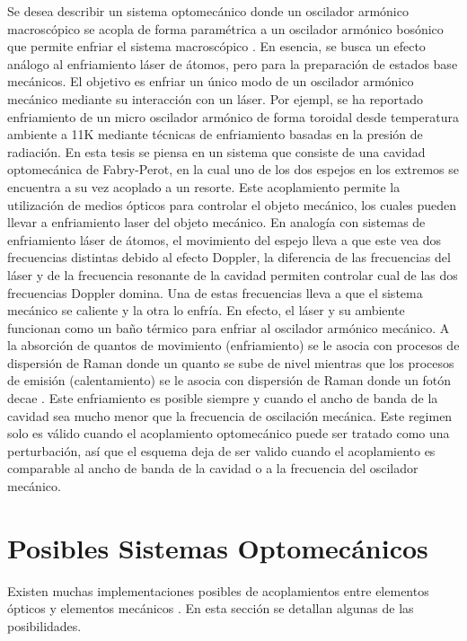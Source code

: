 \documentclass[a4paper,10pt]{report}
\begin{document}
Se desea describir un sistema optomecánico donde un oscilador armónico macroscópico se acopla de forma paramétrica a un oscilador armónico bosónico que permite enfriar el sistema macroscópico \cite{NooshiLC}. En esencia, se busca un efecto análogo al enfriamiento láser de átomos, pero para la preparación de estados base mecánicos. El objetivo es enfriar un único modo de un oscilador armónico mecánico mediante su interacción con un láser. Por ejempl, se ha reportado enfriamiento de un micro oscilador armónico de forma toroidal desde temperatura ambiente a 11K mediante técnicas de enfriamiento basadas en la presión de radiación\cite{SchliesserRPC}. En esta tesis se piensa en un sistema que consiste de una cavidad optomecánica de Fabry-Perot, en la cual uno de los dos espejos en los extremos se encuentra a su vez acoplado a un resorte. Este acoplamiento permite la utilización de medios ópticos para controlar el objeto mecánico, los cuales pueden llevar a enfriamiento laser del objeto mecánico\cite{NooshiLC}. En analogía con sistemas de enfriamiento láser de átomos, el movimiento del espejo lleva a que este vea dos frecuencias distintas debido al efecto Doppler\cite{KippenberCO}, la diferencia de las frecuencias del láser y de la frecuencia resonante de la cavidad permiten controlar cual de las dos frecuencias Doppler domina. Una de estas frecuencias lleva a que el sistema mecánico se caliente y la otra lo enfría. En efecto, el láser y su ambiente funcionan como un baño térmico para enfriar al oscilador armónico mecánico. A la absorción de quantos de movimiento (enfriamiento) se le asocia con procesos de dispersión de Raman donde un quanto se sube de nivel mientras que los procesos de emisión (calentamiento) se le asocia con dispersión de Raman donde un fotón decae \cite{LCNooshi}. Este enfriamiento es posible siempre y cuando el ancho de banda de la cavidad sea mucho menor que la frecuencia de oscilación mecánica. \cite{LCNooshi} \cite{MarquardtSC} Este regimen solo es válido cuando el acoplamiento optomecánico puede ser tratado como una perturbación, así que el esquema deja de ser valido cuando el acoplamiento es comparable al ancho de banda de la cavidad o a la frecuencia del oscilador mecánico.

\section{Posibles Sistemas Optomecánicos}

Existen muchas implementaciones posibles de acoplamientos entre elementos ópticos y elementos mecánicos \cite{KippenberCO}. En esta sección se detallan algunas de las posibilidades.
\end{document}
